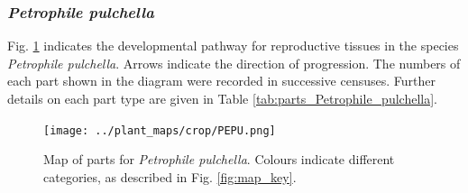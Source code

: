 \documentclass[10pt,twoside]{article}\usepackage[]{graphicx}\usepackage[]{color}
\begin{document}
\endgroup


\clearpage

\subsubsection{\emph{Petrophile pulchella}}

Fig. \ref{fig:map_Petrophile_pulchella} indicates the developmental pathway for reproductive tissues in the species \emph{Petrophile pulchella}. Arrows indicate the direction of progression.  The numbers of each part shown in the diagram were recorded in successive censuses. Further details on each part type are given in Table \ref{tab:parts_Petrophile_pulchella}.

\begin{figure}[h]
\centering
\texttt{[image: ../plant\_maps/crop/PEPU.png]}
\caption{Map of parts for \emph{Petrophile pulchella}. Colours indicate different categories, as described in Fig. \ref{fig:map_key}.}
\label{fig:map_Petrophile_pulchella}
\end{figure}

\clearpage
\end{document}
